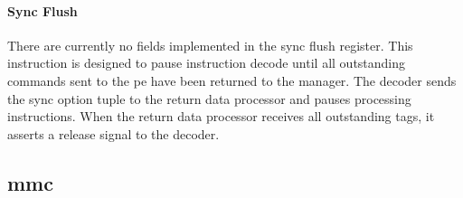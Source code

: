 \paragraph{Sync Flush}

There are currently no fields implemented in the sync flush register.
This instruction is designed to pause instruction decode until all outstanding commands sent to the \ac{pe} have been returned to the manager.
The decoder sends the sync option tuple to the return data processor and pauses processing instructions.
When the return data processor receives all outstanding tags, it asserts a release signal to the decoder.



\iffalse
\subsubsection{Argument Decode}
\label{sec:argumentDecode}
The instruction also includes memory read descriptors. These descriptors include storage descriptor pointers that point to a storage descriptor stored in local memory that encodes where data should be read from for the two operand streamss in each execution lane.
As soon as the memory read descriptor target option is decoded, the read storage descriptor pointers are passed to the \acp{mrc}.
The \acp{mrc} read the actual storage descriptor from their local memory and immediately start sending read commands to the memory via a \ac{mmc}. 
The \ac{mmc} is not shown in the diagram but essentially takes the memory read requests and converts them into the \ac{dram} read protocol.

As soon as read data is sent back to the \ac{mrc} via the \ac{mmc}, that data is aligned with the downstream bus and sent to the 32 Streaming Operations inside the PE.
\fi


\subsection{\Acf{mmc}}
\label{sec:MMC}

